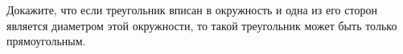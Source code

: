 \begin{ex}
	\begin{condition}
		Докажите, что если треугольник вписан в окружность и одна из его сторон является диаметром этой окружности, то такой треугольник может быть только прямоугольным.
	\end{condition}
\end{ex}
